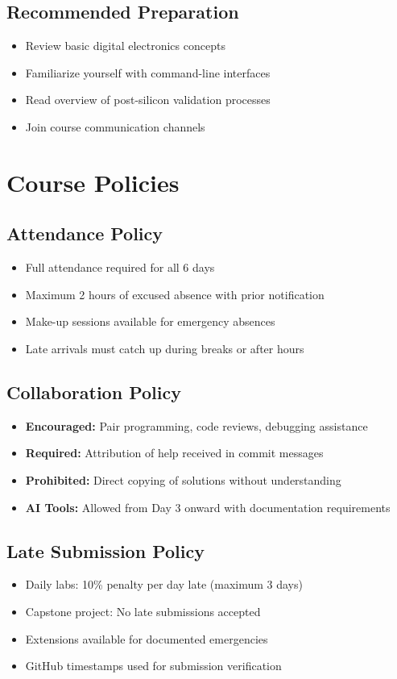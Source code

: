 \documentclass[11pt,a4paper]{article}
\begin{document}
\subsection{Recommended Preparation}
\begin{itemize}
    \item Review basic digital electronics concepts
    \item Familiarize yourself with command-line interfaces
    \item Read overview of post-silicon validation processes
    \item Join course communication channels
\end{itemize}

\section{Course Policies}

\subsection{Attendance Policy}
\begin{itemize}
    \item Full attendance required for all 6 days
    \item Maximum 2 hours of excused absence with prior notification
    \item Make-up sessions available for emergency absences
    \item Late arrivals must catch up during breaks or after hours
\end{itemize}

\subsection{Collaboration Policy}
\begin{itemize}
    \item \textbf{Encouraged:} Pair programming, code reviews, debugging assistance
    \item \textbf{Required:} Attribution of help received in commit messages
    \item \textbf{Prohibited:} Direct copying of solutions without understanding
    \item \textbf{AI Tools:} Allowed from Day 3 onward with documentation requirements
\end{itemize}

\subsection{Late Submission Policy}
\begin{itemize}
    \item Daily labs: 10\% penalty per day late (maximum 3 days)
    \item Capstone project: No late submissions accepted
    \item Extensions available for documented emergencies
    \item GitHub timestamps used for submission verification
\end{itemize}
\end{document}
